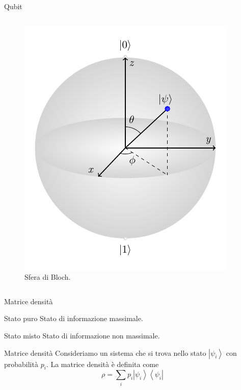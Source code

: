 \documentclass{beamer}
\newcommand{\bra}[1]{\left\langle #1 \right |}
\newcommand{\ket}[1]{\left| #1 \right \rangle}
\renewcommand{\'}[0]{\`}
\begin{document}
\begin{frame}{Qubit}
\begin{columns}
	
	\begin{figure}
	\centering \includegraphics[width=1\textwidth]{./tikz/BlochSphere.pdf}
	\caption{Sfera di Bloch.}
	\end{figure}
	\end{columns}
	

	\end{frame}

	
	\begin{frame}{Matrice densità}
	
	\begin{block}{Stato puro}
	Stato di informazione massimale. 
	\end{block}
	\begin{block}{Stato misto}
	Stato di informazione non massimale. 	
	\end{block}
	
	\begin{alertblock}{Matrice densità}
	Consideriamo un sistema che si trova nello stato $\ket{\psi_i}$ con probabilità $p_i$.
	La matrice densità è definita come 
	\begin{equation*}
	 \rho = \sum_i p_i \ket{\psi_i}\bra{\psi_i} 
	 \end{equation*}
	\end{alertblock}
	

	\end{frame}
\end{document}
